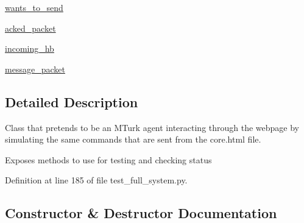\begin{DoxyCompactItemize}
\item 
\hyperlink{classparlai_1_1mturk_1_1core_1_1legacy__2018_1_1test_1_1test__full__system_1_1MockAgent_a1ef4f0d984c2623ad065a6221231ad1d}{wants\+\_\+to\+\_\+send}
\item 
\hyperlink{classparlai_1_1mturk_1_1core_1_1legacy__2018_1_1test_1_1test__full__system_1_1MockAgent_a37c64a2f56235c57623bcf0191691231}{acked\+\_\+packet}
\item 
\hyperlink{classparlai_1_1mturk_1_1core_1_1legacy__2018_1_1test_1_1test__full__system_1_1MockAgent_a97750b8b1110e029b4e82323576f5eb4}{incoming\+\_\+hb}
\item 
\hyperlink{classparlai_1_1mturk_1_1core_1_1legacy__2018_1_1test_1_1test__full__system_1_1MockAgent_ae10810ea77ff6a8322a3f25aa34fb4e5}{message\+\_\+packet}
\end{DoxyCompactItemize}


\subsection{Detailed Description}
\begin{DoxyVerb}Class that pretends to be an MTurk agent interacting through the webpage by
simulating the same commands that are sent from the core.html file.

Exposes methods to use for testing and checking status
\end{DoxyVerb}
 

Definition at line 185 of file test\+\_\+full\+\_\+system.\+py.



\subsection{Constructor \& Destructor Documentation}
\mbox{\label{classparlai_1_1mturk_1_1core_1_1legacy__2018_1_1test_1_1test__full__system_1_1MockAgent_a43e345d7f00632635a5a8f782feda7ba}} 
